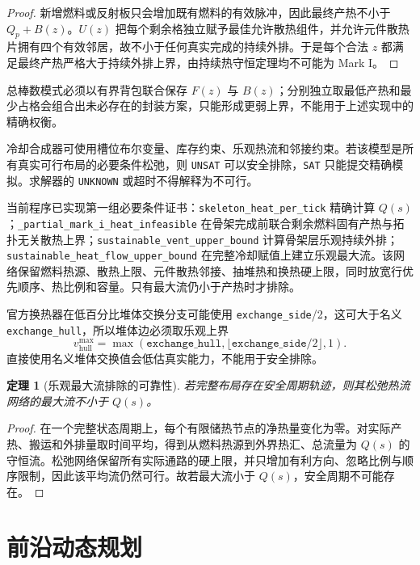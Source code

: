 \documentclass[UTF8,11pt]{ctexart}
\newtheorem{theorem}[definition]{定理}
\begin{document}
\begin{proof}
新增燃料或反射板只会增加既有燃料的有效脉冲，因此最终产热不小于 $Q_p+B(z)$。$U(z)$ 把每个剩余格独立赋予最佳允许散热组件，并允许元件散热片拥有四个有效邻居，故不小于任何真实完成的持续外排。于是每个合法 $z$ 都满足最终产热严格大于持续外排上界，由持续热守恒定理均不可能为 Mark I。
\end{proof}

总棒数模式必须以有界背包联合保存 $F(z)$ 与 $B(z)$；分别独立取最低产热和最少占格会组合出未必存在的封装方案，只能形成更弱上界，不能用于上述实现中的精确权衡。

冷却合成器可使用槽位布尔变量、库存约束、乐观热流和邻接约束。若该模型是所有真实可行布局的必要条件松弛，则 \texttt{UNSAT} 可以安全排除，\texttt{SAT} 只能提交精确模拟。求解器的 \texttt{UNKNOWN} 或超时不得解释为不可行。

当前程序已实现第一组必要条件证书：\texttt{skeleton\_heat\_per\_tick} 精确计算 $Q(s)$；\texttt{\_partial\_mark\_i\_heat\_infeasible} 在骨架完成前联合剩余燃料固有产热与拓扑无关散热上界；\texttt{sustainable\_vent\_upper\_bound} 计算骨架层乐观持续外排；\texttt{sustainable\_heat\_flow\_upper\_bound} 在完整冷却赋值上建立乐观最大流。该网络保留燃料热源、散热上限、元件散热邻接、抽堆热和换热硬上限，同时放宽行优先顺序、热比例和容量。只有最大流仍小于产热时才排除。

官方换热器在低百分比堆体交换分支可能使用 \texttt{exchange\_side}/2，这可大于名义 \texttt{exchange\_hull}，所以堆体边必须取乐观上界
\[
v_{\mathrm{hull}}^{\max}=\max(\texttt{exchange\_hull},\lfloor\texttt{exchange\_side}/2\rfloor,1).
\]
直接使用名义堆体交换值会低估真实能力，不能用于安全排除。

\begin{theorem}[乐观最大流排除的可靠性]
若完整布局存在安全周期轨迹，则其松弛热流网络的最大流不小于 $Q(s)$。
\end{theorem}

\begin{proof}
在一个完整状态周期上，每个有限储热节点的净热量变化为零。对实际产热、搬运和外排量取时间平均，得到从燃料热源到外界热汇、总流量为 $Q(s)$ 的守恒流。松弛网络保留所有实际通路的硬上限，并只增加有利方向、忽略比例与顺序限制，因此该平均流仍然可行。故若最大流小于 $Q(s)$，安全周期不可能存在。
\end{proof}

\section{前沿动态规划}
\end{document}
